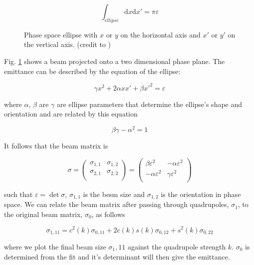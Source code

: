 \[ \int_{ellipse}\mathrm{d}x\mathrm{d}x' =\pi\varepsilon \]

\begin{figure}[!t]
	\centering
	\caption{Phase space ellipse with \(x\) or \(y\) on the horizontal axis
		and \(x'\) or \(y'\) on the vertical axis. (credit to
		\cite{wiedemann2007particle})}
	\label{fig:phase_space}
\end{figure}

Fig. \ref{fig:phase_space} shows a beam projected onto a two dimensional phase
plane. The emittance can be described by the equation of the ellipse:

\[ \gamma x^2 + 2\alpha xx' + \beta x'^2 = \varepsilon \]

where \(\alpha\),  \(\beta\) are \(\gamma\) are ellipse parameters that
determine the ellipse's shape and orientation and are related by this equation

\[ \beta\gamma - \alpha^2 = 1 \]



It follows that the beam matrix is

\[\sigma =
	\begin{pmatrix}
	  \sigma_{1,1} & \sigma_{1,2} \\
	  \sigma_{2,1} & \sigma_{2,2} \\
	\end{pmatrix}
	=
	\begin{pmatrix}
	  \beta\varepsilon^2 & -\alpha\varepsilon^2 \\
	  -\alpha\varepsilon^2 & \gamma\varepsilon^2 \\
	\end{pmatrix}
\]

such that \(\varepsilon = \det\sigma\), \(\sigma_{1,1}\) is the besm size and
\(\sigma_{1,2}\) is the orientation in phase space. We can relate the beam
matrix after passing through quadrupoles, \(\sigma_1\), to the original beam
matrix, \(\sigma_0\), as follows

\[
	\sigma_{1,11} = c^2(k)\sigma_{0,11} + 2c(k)s(k)\sigma_{0,12} +
	s^2(k)\sigma_{0,22}
\]

where we plot the final beam size \(\sigma_1,11\) against the quadrupole
strength \(k\).  \(\sigma_0\) is determined from the fit and it's determinant
will then give the emittance.


